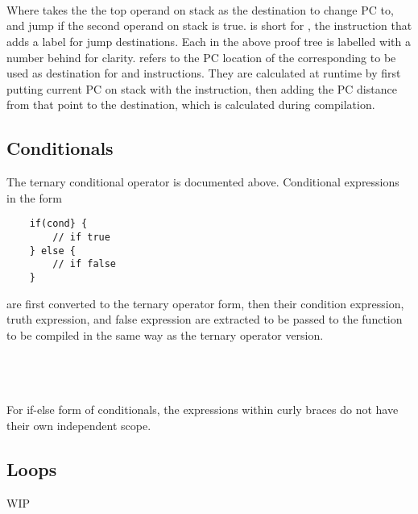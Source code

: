\begin{prooftree}
\end{prooftree}\\\\\\
Where  takes the the top operand on stack as the destination to change PC to, and jump if the second operand on stack is true.  is short for , the instruction that adds a label for jump destinations. Each  in the above proof tree is labelled with a number behind for clarity.  refers to the PC location of the corresponding  to be used as destination for  and  instructions. They are calculated at runtime by first putting current PC on stack with the  instruction, then adding the PC distance from that point to the destination, which is calculated during compilation. 

\subsection{Conditionals}
The ternary conditional operator is documented above. Conditional expressions in the form 
\begin{verbatim}
    if(cond} {
        // if true
    } else {
        // if false
    }
\end{verbatim}
are first converted to the ternary operator form, then their condition expression, truth expression, and false expression are extracted to be passed to the  function to be compiled in the same way as the ternary operator version. \\\\
\begin{prooftree}
\end{prooftree}\\\\
For if-else form of conditionals, the expressions within curly braces do not have their own independent scope. 

\subsection{Loops}
WIP

